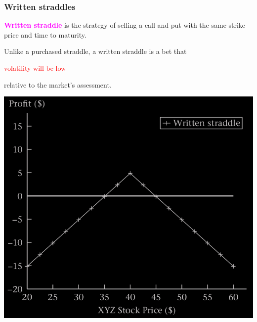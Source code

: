 \begin{frame}[fragile,t]
	\frametitle{Written straddles}

	\textcolor{magenta}{\bf Written straddle} is the strategy of
	selling a call and put with the same strike price and time to maturity.
	\bigskip


	\begin{center}
		Unlike a purchased straddle, a written straddle is a bet that \\
		\bigskip

		\textcolor{red}{volatility will be low}
		\bigskip

		relative to the market’s assessment.
	\end{center}

	\bigskip

	\begin{center}
		\includegraphics[scale=0.25]{figs/Figure-3-12.png}
	\end{center}
\end{frame}
